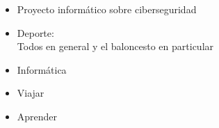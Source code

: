 \documentclass[10pt,a4paper,ragged2e]{altacv}
\begin{document}



\divider
{}
\begin{itemize}
	\item Proyecto informático sobre ciberseguridad
\end{itemize}

\medskip

\begin{itemize}
	\item Deporte: \\  \medskip \quad Todos en general y el baloncesto en particular \\
\divider
	\item Inform\'atica \\
\divider
	\item Viajar \\
\divider
	\item Aprender
\end{itemize}









\end{document}
